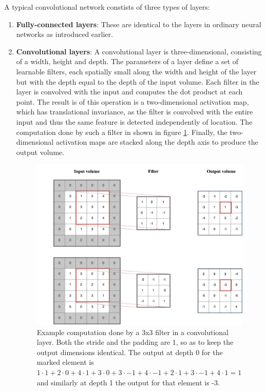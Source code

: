 \documentclass[12pt,a4paper,twoside,openright]{report}
\begin{document}
A typical convolutional network constists of three types of layers:
\begin{enumerate}
	\item \textbf{Fully-connected layers}: These are identical to the layers in ordinary neural networks as introduced earlier.
	\item \textbf{Convolutional layers}: A convolutional layer is three-dimensional, consisting of a width, height and depth. The parameters of a layer define a set of learnable filters, each spatially small along the width and height of the layer but with the depth equal to the depth of the input volume. Each filter in the layer is convolved with the input and computes the dot product at each point. The result is of this operation is a two-dimensional activation map, which has translational invariance, as the filter is convolved with the entire input and thus the same feature is detected independently of location. The computation done by such a filter in shown in figure \ref{fig:conv_example}. Finally, the two-dimensional activation maps are stacked along the depth axis to produce the output volume.
	
	\begin{figure}
		\centering
		\includegraphics[scale=0.6]{conv_example}
		\caption[Example computation done by a 3x3 filter in a convolutional layer]{Example computation done by a 3x3 filter in a convolutional layer. Both the stride and the padding are 1, so as to keep the output dimensions identical. The output at depth 0 for the marked element is $1 \cdot 1 + 2 \cdot 0 + 4 \cdot 1 + 3 \cdot 0 + 3 \cdot -1 + 4 \cdot -1 + 2 \cdot 1 + 3 \cdot -1 + 4 \cdot 1 = 1$ and similarly at depth 1 the output for that element is -3.}
		\label{fig:conv_example}
	\end{figure}


\end{enumerate}
\end{document}
